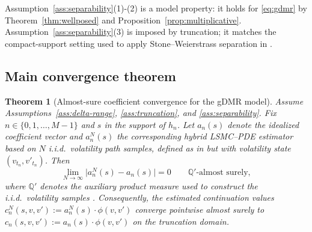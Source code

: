 \documentclass[10pt]{article}
\theoremstyle{plain}
\newtheorem{theorem}{Theorem}[section]
\theoremstyle{definition}
\theoremstyle{remark}
\newcommand{\Q}{\mathbb Q}
\begin{document}
Assumption~\ref{ass:separability}(1)-(2) is a model property: it holds for \eqref{eq:gdmr} by
Theorem~\ref{thm:wellposed} and Proposition~\ref{prop:multiplicative}. Assumption~\ref{ass:separability}(3) is imposed
by truncation; it matches the compact-support setting used to apply Stone--Weierstrass separation in
\citet{farahany2020mixing}.

\subsection{Main convergence theorem}

\begin{theorem}[Almost-sure coefficient convergence for the gDMR model]\label{thm:as-conv}
Assume Assumptions~\ref{ass:delta-range}, \ref{ass:truncation}, and \ref{ass:separability}.
Fix $n\in\{0,1,\ldots,M-1\}$ and $s$ in the support of $h_n$.
Let $a_n(s)$ denote the idealized coefficient vector and $a_n^N(s)$ the corresponding hybrid LSMC--PDE estimator based
on $N$ i.i.d.\ volatility path samples, defined as in \citet[Section~3.3]{farahany2020mixing} but with volatility state
$(v_{t_n},v'_{t_n})$.
Then
\[
\lim_{N\to\infty}\bigl|a_n^N(s)-a_n(s)\bigr|=0
\qquad \Q'\text{-almost surely},
\]
where $\Q'$ denotes the auxiliary product measure used to construct the i.i.d.\ volatility samples
\citep[Section~3.2.4]{farahany2020mixing}.
Consequently, the estimated continuation values $c_n^N(s,v,v'):=a_n^N(s)\cdot\phi(v,v')$ converge pointwise almost surely
to $c_n(s,v,v'):=a_n(s)\cdot\phi(v,v')$ on the truncation domain.
\end{theorem}
\end{document}
